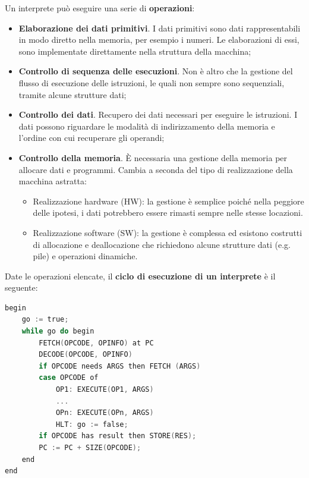 \documentclass[a4paper]{article}
\begin{document}
	Un interprete può eseguire una serie di \textbf{operazioni}:
	\begin{itemize}
		\item \textcolor{Red3}{\textbf{Elaborazione dei dati primitivi}}. I dati primitivi sono dati rappresentabili in modo diretto nella memoria, per esempio i numeri. Le elaborazioni di essi, sono implementate direttamente nella struttura della macchina;
		
		\item \textcolor{Red3}{\textbf{Controllo di sequenza delle esecuzioni}}. Non è altro che la gestione del flusso di esecuzione delle istruzioni, le quali non sempre sono sequenziali, tramite alcune strutture dati;
		
		\item \textcolor{Red3}{\textbf{Controllo dei dati}}. Recupero dei dati necessari per eseguire le istruzioni. I dati possono riguardare le modalità di indirizzamento della memoria e l'ordine con cui recuperare gli operandi;
		
		\item \textcolor{Red3}{\textbf{Controllo della memoria}}. È necessaria una gestione della memoria per allocare dati e programmi. Cambia a seconda del tipo di realizzazione della macchina astratta:
		\begin{itemize}
			\item Realizzazione hardware (HW): la gestione è semplice poiché nella peggiore delle ipotesi, i dati potrebbero essere rimasti sempre nelle stesse locazioni.
			
			\item Realizzazione software (SW): la gestione è complessa ed esistono costrutti di allocazione e deallocazione che richiedono alcune strutture dati (e.g. pile) e operazioni dinamiche.
		\end{itemize}
	\end{itemize}
	Date le operazioni elencate, il \textcolor{Red3}{\textbf{ciclo di esecuzione di un interprete}} è il seguente:
	\begin{lstlisting}[language=C]
begin
	go := true;
	while go do begin
		FETCH(OPCODE, OPINFO) at PC
		DECODE(OPCODE, OPINFO)
		if OPCODE needs ARGS then FETCH (ARGS)
		case OPCODE of
			OP1: EXECUTE(OP1, ARGS)
			...
			OPn: EXECUTE(OPn, ARGS)
			HLT: go := false;
		if OPCODE has result then STORE(RES);
		PC := PC + SIZE(OPCODE);
	end
end \end{lstlisting}
\end{document}
